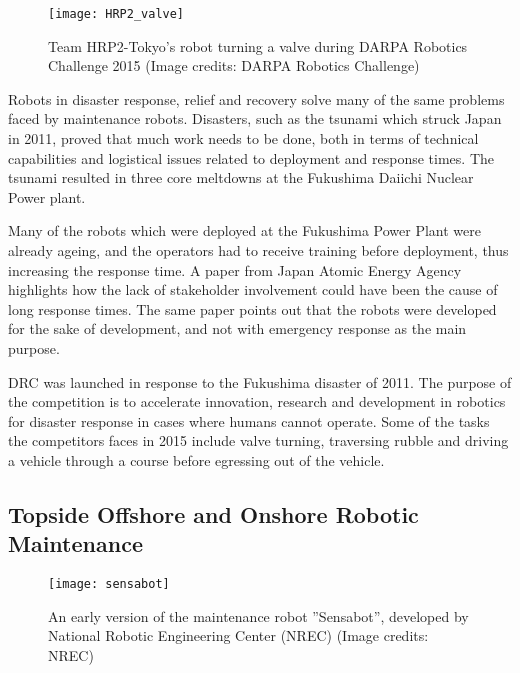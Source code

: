 \begin{wrapfigure}{r}{0.5\textwidth}
	\begin{center}
		\texttt{[image: HRP2\_valve]}
	\end{center}
	
	\caption{Team HRP2-Tokyo's robot turning a valve during DARPA Robotics Challenge 2015 (Image credits: DARPA Robotics Challenge)}
\end{wrapfigure}

Robots in disaster response, relief and recovery solve many of the same problems faced by maintenance robots. Disasters, such as the tsunami which struck Japan in 2011, proved that much work needs to be done, both in terms of technical capabilities and logistical issues related to deployment and response times. The tsunami resulted in three core meltdowns at the Fukushima Daiichi Nuclear Power plant.

Many of the robots which were deployed at the Fukushima Power Plant were already ageing, and the operators had to receive training before deployment, thus increasing the response time\cite{doi:10.1108/01439911211249715}. A paper from Japan Atomic Energy Agency\cite{doi:10.1108/01439911211249715} highlights how the lack of stakeholder involvement could have been the cause of long response times. The same paper points out that the robots were developed for the sake of development, and not with emergency response as the main purpose\cite{doi:10.1108/01439911211249715}. 

\ac{DRC}\cite{DRC} was launched in response to the Fukushima disaster of 2011. The purpose of the competition is to accelerate innovation, research and development in robotics for disaster response in cases where humans cannot operate. Some of the tasks the competitors faces in 2015 include valve turning, traversing rubble and driving a vehicle through a course before egressing out of the vehicle.

\subsection{Topside Offshore and Onshore Robotic Maintenance}

\begin{wrapfigure}{l}{0.45\textwidth}
	\begin{center}
		\texttt{[image: sensabot]}
	\end{center}
	
	\caption{An early version of the maintenance robot ''Sensabot'', developed by National Robotic Engineering Center (NREC) (Image credits: NREC)}
	\vspace{-20pt}
\end{wrapfigure} 

